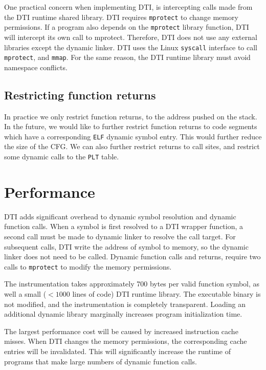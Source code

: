 \documentclass[letterpaper,twocolumn,10pt]{article}
\begin{document}
    One practical concern when implementing DTI, is intercepting calls made from the DTI runtime shared library. DTI requires {\tt mprotect} to change memory permissions. If a program also depends on the {\tt mprotect} library function, DTI will intercept its own call to mprotect. Therefore, DTI does not use any external libraries except the dynamic linker. DTI  uses the Linux {\tt syscall} interface to call {\tt mprotect}, and {\tt mmap}. For the same reason, the DTI runtime library must avoid namespace conflicts. 
    
    \subsection{Restricting function returns}
    
    In practice we only restrict function returns, to the address pushed on the stack. In the future, we would like to further restrict function returns to code segments which have a corresponding {\tt ELF} dynamic symbol entry. This would further reduce the size of the CFG. We can also further restrict returns to call sites, and restrict some dynamic calls to the {\tt PLT} table. 



\section{Performance}

    DTI adds significant overhead to dynamic symbol resolution and dynamic function calls. When a symbol is first resolved to a DTI wrapper function, a second call must be made to dynamic linker to resolve the call target. For subsequent calls, DTI write the address of symbol to memory, so the dynamic linker does not need to be called. Dynamic function calls and returns, require two calls to {\tt mprotect} to modify the memory permissions. 
    
    The instrumentation takes approximately 700 bytes per valid function symbol, as well a small ($<1000$ lines of code) DTI runtime library. The executable binary is not modified, and the instrumentation is completely transparent. Loading an additional dynamic library marginally increases program initialization time.
    
    The largest performance cost will be caused by increased instruction cache misses. When DTI changes the memory permissions, the corresponding cache entries will be invalidated. This will significantly increase the runtime of programs that make large numbers of dynamic function calls.
    
\end{document}
